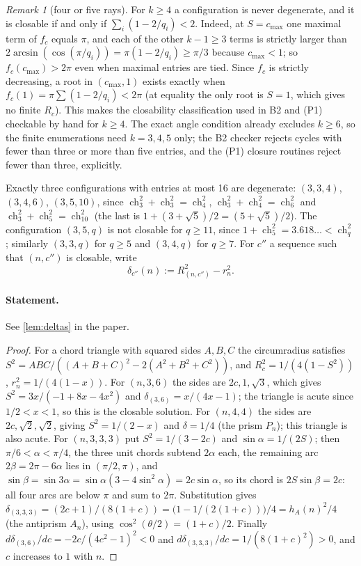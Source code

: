\documentclass[11pt]{article}
\theoremstyle{definition}
\theoremstyle{remark}
\newtheorem{remark}[theorem]{Remark}
\newcommand{\ch}{\operatorname{ch}}
\begin{document}
\setcounter{theorem}{5}
\begin{remark}[four or five rays]\label{rem:k4}
For $k\ge4$ a configuration is never degenerate, and it is closable if and
only if $\sum_i(1-2/q_i)<2$. Indeed, at $S=c_{\max}$ one maximal term of
$f_c$ equals $\pi$, and each of the other $k-1\ge3$ terms is strictly larger
than $2\arcsin(\cos(\pi/q_i))=\pi(1-2/q_i)\ge\pi/3$ because $c_{\max}<1$; so
$f_c(c_{\max})>2\pi$ even when maximal entries are tied. Since $f_c$ is
strictly decreasing, a root in $(c_{\max},1)$ exists exactly when
$f_c(1)=\pi\sum(1-2/q_i)<2\pi$ (at equality the only root is $S=1$, which
gives no finite $R_c$). This makes the closability classification used in
B2 and (P1) checkable by hand for $k\ge4$. The exact angle condition already
excludes $k\ge6$, so the finite enumerations need $k=3,4,5$ only; the B2
checker rejects cycles with fewer than three or more than five entries,
and the (P1) closure routines reject fewer than three, explicitly.
\end{remark}


Exactly three configurations with entries at most 16 are degenerate:
$(3,3,4)$, $(3,4,6)$, $(3,5,10)$, since
$\ch_3^2+\ch_3^2=\ch_4^2$, $\ch_3^2+\ch_4^2=\ch_6^2$ and
$\ch_3^2+\ch_5^2=\ch_{10}^2$ (the last is $1+(3+\sqrt5)/2=(5+\sqrt5)/2$). The
configuration $(3,5,q)$ is not closable for $q\ge11$, since
$1+\ch_5^2=3.618\ldots<\ch_q^2$; similarly $(3,3,q)$ for $q\ge5$ and $(3,4,q)$
for $q\ge7$. For $c''$ a sequence such that $(n,c'')$ is closable, write
\[\delta_{c''}(n):=R_{(n,c'')}^2-r_n^2.\]

\paragraph{Statement.} See \ref{lem:deltas} in the paper.

\begin{proof}
For a chord triangle with squared sides $A,B,C$ the circumradius satisfies
$S^2=ABC/((A+B+C)^2-2(A^2+B^2+C^2))$, and $R_c^2=1/(4(1-S^2))$,
$r_n^2=1/(4(1-x))$. For $(n,3,6)$ the sides are $2c,1,\sqrt3$, which gives
$S^2=3x/(-1+8x-4x^2)$ and $\delta_{(3,6)}=x/(4x-1)$; the triangle is acute
since $1/2<x<1$, so this is the closable solution. For $(n,4,4)$ the sides
are $2c,\sqrt2,\sqrt2$, giving $S^2=1/(2-x)$ and $\delta=1/4$ (the prism
$P_n$); this triangle is also acute. For $(n,3,3,3)$ put $S^2=1/(3-2c)$
and $\sin\alpha=1/(2S)$; then $\pi/6<\alpha<\pi/4$, the three unit chords
subtend $2\alpha$ each, the remaining arc $2\beta=2\pi-6\alpha$ lies in
$(\pi/2,\pi)$, and $\sin\beta=\sin3\alpha=\sin\alpha(3-4\sin^2\alpha)=2c\sin\alpha$,
so its chord is $2S\sin\beta=2c$: all four arcs are below $\pi$ and sum to
$2\pi$. Substitution gives $\delta_{(3,3,3)}=(2c+1)/(8(1+c))
=\bigl(1-1/(2(1+c))\bigr)/4=h_A(n)^2/4$ (the antiprism $A_n$), using
$\cos^2(\theta/2)=(1+c)/2$. Finally
$d\delta_{(3,6)}/dc=-2c/(4c^2-1)^2<0$ and
$d\delta_{(3,3,3)}/dc=1/(8(1+c)^2)>0$, and $c$ increases to $1$ with $n$.
\end{proof}
\end{document}

